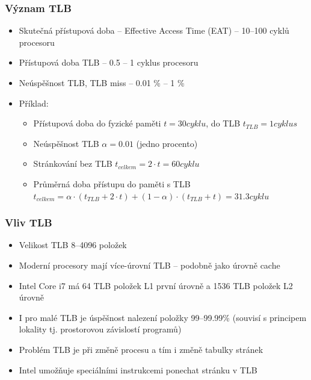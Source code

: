 \documentclass{beamer}
\begin{document}
\begin{frame}
\frametitle{Význam TLB}
\begin{itemize}
\item Skutečná přístupová doba -- Effective Access Time (EAT) -- 10--100 cyklů procesoru
‏\item Přístupová doba TLB -- 0.5 -- 1 cyklus procesoru
\item Neúspěšnost TLB, TLB miss -- 0.01 \% -- 1 \%
\item Příklad:
\begin{itemize}
\item Přístupová doba do fyzické paměti $t=30 cyklu$, do TLB $t_{TLB} = 1 cyklus$
\item Neúspěšnost TLB $\alpha = 0.01$ (jedno procento)
\item Stránkování bez TLB $ t_{celkem} = 2\cdot t = 60 cyklu$
\item Průměrná doba přístupu do paměti s TLB $ t_{celkem} = \alpha \cdot (t_{TLB}+2\cdot t) + (1-\alpha)\cdot (t_{TLB}+t) = 31.3 cyklu $
\end{itemize}
\end{itemize}
\end{frame}



\begin{frame}
\frametitle{Vliv TLB}
\begin{itemize}
\item Velikost TLB 8--4096 položek
\item Moderní procesory mají více-úrovní TLB – podobně jako úrovně cache
\item Intel Core i7 má 64 TLB položek L1 první úrovně a 1536 TLB položek L2 úrovně
\item I pro malé TLB je úspěšnost nalezení položky 99--99.99\% (souvisí s principem lokality tj. prostorovou závislostí programů)
\item Problém TLB je při změně procesu a tím i změně tabulky stránek
\item Intel umožňuje speciálními instrukcemi ponechat stránku v TLB
\end{itemize}
\end{frame}
\end{document}
